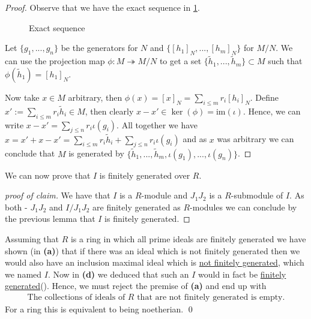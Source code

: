 \documentclass{article}
\newcommand{\contradiction}{\lightning}
\newcommand{\im}{\mathrm{im}}
\theoremstyle{definition}
\theoremstyle{plain}
\theoremstyle{remark}
\begin{document}
\begin{proof}
	Observe that we have the exact sequence in \cref{Ex11Figure}.
\begin{figure}[ht]
\centering
{}
\caption{Exact sequence}\label{Ex11Figure}
\end{figure}
	
	Let $\{g_1,...,g_n\}$ be the generators for $N$ and $\{[h_1]_N,...,[h_m]_N\}$ for $M/N$. We can use the projection map $\phi:M\twoheadrightarrow M/N$ to get a set $\{\tilde{h}_1,...,\tilde{h}_m\}\subset M$ such that $\phi(\tilde{h}_1)=[h_1]_N$.

	Now take $x\in M$ arbitrary, then $\phi(x)=[x]_N = \sum_{i\leq m}r_i[h_i]_N$. Define $x' := \sum_{i\leq m}r_i\tilde{h}_i\in M$, then clearly $x-x'\in \ker (\phi)=\im(\iota)$. Hence, we can write $x-x' = \sum_{j\leq n}r_i \iota(g_i)$.
	All together we have $x = x' + x - x' = \sum_{i\leq m}r_i\tilde{h}_i+ \sum_{j\leq n}r_i \iota(g_i)$ and as $x$ was arbitrary we can conclude that $M$ is generated by $\{\tilde{h}_1,...,\tilde{h}_m,\iota(g_1),...,\iota(g_n)\}$.
\end{proof}
We can now prove that $I$ is finitely generated over $R$.
\begin{proof}[proof of claim]
	We have that $I$ is a $R$-module and $J_1J_2$ is a $R$-submodule of $I$. As both - $J_1J_2$ and $I/J_1J_2$ are finitely generated as $R$-modules we can conclude by the previous lemma that $I$ is finitely generated.
\end{proof}
Assuming that $R$ is a ring in which all prime ideals are finitely generated we have shown (in \textbf{(a)}) that if there was an ideal which is not finitely generated then we would also have an inclusion maximal ideal which is \underline{not finitely generated}, which we named $I$. Now in \textbf{(d)} we deduced that such an $I$ would in fact be \underline{finitely generated}(\contradiction). Hence, we must reject the premise of \textbf{(a)} and end up with 
\begin{align}
	\text{The collections of ideals of } R \text{ that are not finitely generated is empty}.
\end{align}
For a ring this is equivalent to being noetherian. \qed
\end{document}
